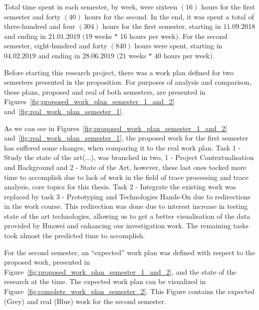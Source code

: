 Total time spent in each semester, by week, were sixteen $(16)$ hours for the first semester and forty $(40)$ hours for the second. In the end, it was spent a total of three-hundred and four $(304)$ hours for the first semester, starting in $11.09.2018$ and ending in $21.01.2019$ $(19$ weeks $*$ $16$ hours per week$)$. For the second semester, eight-hundred and forty $(840)$ hours were spent, starting in $04.02.2019$ and ending in $28.06.2019$ $(21$ weeks $*$ $40$ hours per week$)$.

Before starting this research project, there was a work plan defined for two semesters presented in the proposition. For purposes of analysis and comparison, these plans, proposed and real of both semesters, are presented in Figures~\ref{fig:proposed_work_plan_semester_1_and_2} and~\ref{fig:real_work_plan_semester_1}.

As we can see in Figures~\ref{fig:proposed_work_plan_semester_1_and_2} and~\ref{fig:real_work_plan_semester_1}, the proposed work for the first semester has suffered some changes, when comparing it to the real work plan. Task 1 - Study the state of the art(...), was branched in two, 1 - Project Contextualisation and Background and 2 - State of the Art, however, these last ones tocked more time to accomplish due to lack of work in the field of trace processing and trace analysis, core topics for this thesis. Task 2 - Integrate the existing work was replaced by task 3 - Prototyping and Technologies Hands-On due to redirections in the work course. This redirection was done due to interest increase in testing state of the art technologies, allowing us to get a better visualisation of the data provided by Huawei and enhancing our investigation work. The remaining tasks took almost the predicted time to accomplish.

For the second semester, an ``expected'' work plan was defined with respect to the proposed work, presented in Figure~\ref{fig:proposed_work_plan_semester_1_and_2}, and the state of the research at the time. The expected work plan can be visualized in Figure~\ref{fig:complete_work_plan_semester_2}. This Figure contains the expected (Grey) and real (Blue) work for the second semester.


